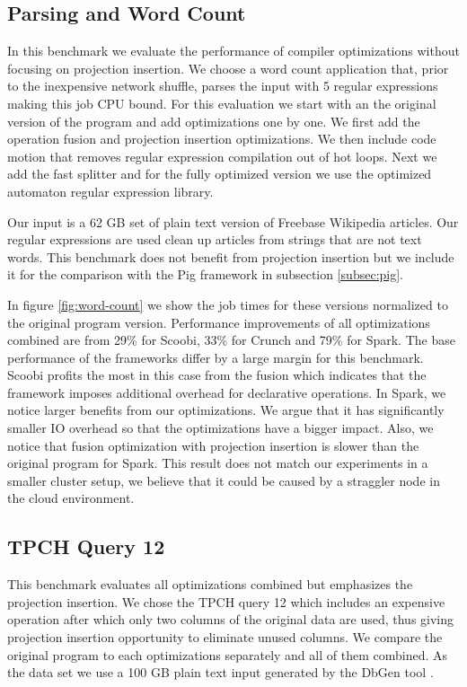 \subsection{Parsing and Word Count}
\label{subsec:parsing-word-count}

In this benchmark we evaluate the performance of \tool compiler optimizations without focusing on projection insertion. We choose a word count application that, prior to the inexpensive network shuffle, parses the input with 5 regular expressions making this job CPU bound. For this evaluation we start with an the original version of the program and add optimizations one by one. We first add the operation fusion and projection insertion optimizations. We then include code motion that removes regular expression compilation out of hot loops. Next we add the fast splitter and for the fully optimized version we use the optimized automaton regular expression library.    

Our input is a 62 GB set of plain text version of Freebase Wikipedia articles. Our regular expressions are used clean up articles from strings that are not text words. This benchmark does not benefit from projection insertion but we include it for the comparison with the Pig framework in subsection \ref{subsec:pig}.

In figure \ref{fig:word-count} we show the job times for these versions normalized to the original program version. Performance improvements of all optimizations combined are from 29\% for Scoobi, 33\% for Crunch and 79\% for Spark. The base performance of the frameworks differ by a large margin for this benchmark. Scoobi profits the most in this case from the fusion which indicates that the framework imposes additional overhead for declarative operations. In Spark, we notice larger benefits from our optimizations. We argue that it has significantly smaller IO overhead so that the optimizations have a bigger impact. Also, we notice that fusion optimization with projection insertion is slower than the original program for Spark. This result does not match our experiments in a smaller cluster setup, we believe that it could be caused by a straggler node in the cloud environment.

\subsection{TPCH Query 12}
\label{subsec:tpch-query-12}

This benchmark evaluates all optimizations combined but emphasizes the projection insertion. We chose the TPCH query 12 which includes an expensive  operation after which only two columns of the original data are used, thus giving projection insertion opportunity to eliminate unused columns. We compare the original program to each optimizations separately and all of them combined. As the data set we use a 100 GB plain text input generated by the DbGen tool \cite{tpch}.

